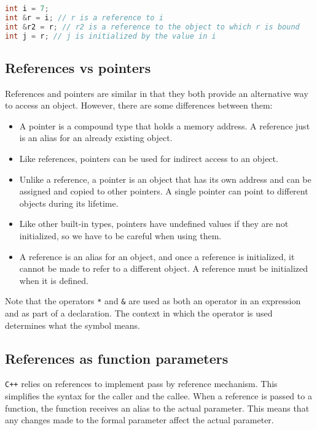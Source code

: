 \begin{lstlisting}[language=C++]
int i = 7;
int &r = i; // r is a reference to i
int &r2 = r; // r2 is a reference to the object to which r is bound
int j = r; // j is initialized by the value in i
\end{lstlisting}

\subsection{References vs pointers}

References and pointers are similar in that they both provide an alternative way
to access an object. However, there are some differences between them:

\begin{itemize}
    \item A pointer is a compound type that holds a memory address. A reference
    just is an alias for an already existing object.
    \item Like references, pointers can be used for indirect access to an object.
    \item Unlike a reference, a pointer is an object that has its own address and
    can be assigned and copied to other pointers. A single pointer can point to
    different objects during its lifetime.
    \item Like other built-in types, pointers have undefined values if they are
    not initialized, so we have to be careful when using them.
    \item A reference is an alias for an object, and once a reference is initialized,
    it cannot be made to refer to a different object. A reference must be initialized
    when it is defined.
\end{itemize}

Note that the operators \texttt{*} and \texttt{\&} are used as both an operator in an
expression and as part of a declaration. The context in which the operator is used
determines what the symbol means.\\

\subsection{References as function parameters}

\texttt{C++} relies on references to implement pass by reference mechanism. This
simplifies the syntax for the caller and the callee. When a reference is passed
to a function, the function receives an alias to the actual parameter. This means
that any changes made to the formal parameter affect the actual parameter.\\

